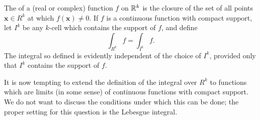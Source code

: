 \begin{mydef}
    \label{mydef:10.3}
    The  of a (real or complex) function $f$ on ${\protect\mathbb R}^k$ is the
    closure of the set of all points $\mathbf{x} \in R^k$
    at which $f(\mathbf{x}) \neq 0$.
    If $f$ is a continuous function with compact support,
    let $I^k$ be any $k$-cell which contains the support of $f$,
    and define
    \begin{equation}
        \label{eq:10.3}
        \int_{R^k} f =
        \int_{I^k} f .
    \end{equation}
    The integral so defined is evidently independent of the choice of $I^k$, provided only that $I^k$ contains the support of $f$.

\end{mydef}


It is now tempting to extend the definition of the integral over $R^k$ to
functions which are limits (in some sense) of continuous functions with compact support.
We do not want to discuss the conditions under which this can be done;
the proper setting for this question is the Lebesgue integral.

